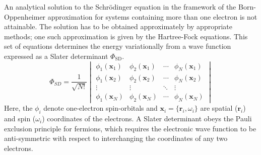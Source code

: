An analytical solution to the Schr\"odinger equation in the framework of
the Born-Oppenheimer approximation for systems containing more than one
electron is not attainable. The solution has to be obtained approximately by appropriate
methods; one such approximation is given by the Hartree-Fock equations. This set of
equations determines the energy variationally from a wave function expressed as a Slater
determinant
$\Phi_\text{SD}$.\autocite{Slater_TheoryComplexSpectra_1929,Fock_NaeherungsmethodezurLoesung_1930}
%
\begin{equation}
     \Phi_{SD}=\frac{1}{\sqrt{N!}}
     \begin{vmatrix}
         \phi_1(\mathbf{x}_1) & \phi_2(\mathbf{x}_1) & \cdots & \phi_N(\mathbf{x}_1)\\
         \phi_1(\mathbf{x}_2) & \phi_2 (\mathbf{x}_2) & \cdots & \phi_N(\mathbf{x}_2)\\
         \vdots & \vdots & \ddots & \vdots\\
         \phi_1(\mathbf{x}_N) & \phi_2(\mathbf{x}_N) & \cdots & \phi_N(\mathbf{x}_N)
     \end{vmatrix}
     \label{eqn:SlaterDet}
\end{equation}
%
Here, the $\phi_i$ denote one-electron spin-orbitals and
$\mathbf{x}_i=\{\mathbf{r}_i,\omega_i\}$ are spatial ($\mathbf{r}_i$) and spin
($\omega_i$) coordinates of the electrons. A Slater determinant obeys the Pauli
exclusion principle for fermions, which requires the electronic wave function to be
anti-symmetric with respect to interchanging the coordinates of any two electrons.


